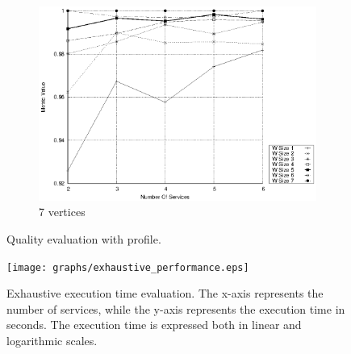 \begin{figure}[h]
\begin{subfigure}{0.33\textwidth}
    \includegraphics[width=\textwidth]{Images/graphs/window_quality_performance_diff_qual_n7_s7_50_80_n7}
    \caption{7 vertices}
    \label{fig:quality_window_average_qualitative_n7}
  \end{subfigure}

  \caption{ Quality evaluation with \wide profile.}
  \label{fig:quality_window_average_qualitative}
\end{figure}

\begin{figure}
  \texttt{[image: graphs/exhaustive\_performance.eps]}
  \caption{Exhaustive execution time evaluation. The x-axis represents the number of services, while the y-axis represents the execution time in seconds. The execution time is expressed both in linear and logarithmic scales.}
  \label{fig:perf_exhaustive}
\end{figure}

